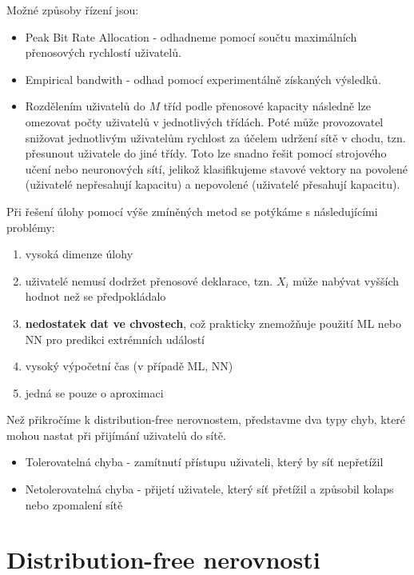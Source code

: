 \documentclass{article}
\theoremstyle{remark}
\theoremstyle{plain}
\theoremstyle{definition}
\theoremstyle{remark}
\begin{document}
Možné způsoby řízení jsou:

\begin{itemize}
    \item Peak Bit Rate Allocation - odhadneme pomocí součtu maximálních přenosových rychlostí uživatelů.
    \item Empirical bandwith - odhad pomocí experimentálně získaných výsledků.
    \item Rozdělením uživatelů do $M$ tříd podle přenosové kapacity následně lze omezovat počty uživatelů v jednotlivých třídách. Poté může provozovatel snižovat jednotlivým uživatelům rychlost za účelem udržení sítě v chodu, tzn. přesunout uživatele do jiné třídy. Toto lze snadno řešit pomocí strojového učení nebo neuronových sítí, jelikož klasifikujeme stavové vektory na povolené (uživatelé nepřesahují kapacitu) a nepovolené (uživatelé přesahují kapacitu).
\end{itemize}

Při řešení úlohy pomocí výše zmíněných metod se potýkáme s následujícími problémy:

\begin{enumerate}
    \item vysoká dimenze úlohy
    \item uživatelé nemusí dodržet přenosové deklarace, tzn. $X_i$ může nabývat vyšších hodnot než se předpokládalo
    \item \textbf{nedostatek dat ve chvostech}, což prakticky znemožňuje použití ML nebo NN pro predikci extrémních událostí
    \item vysoký výpočetní čas (v případě ML, NN)
    \item jedná se pouze o aproximaci
\end{enumerate}

Než přikročíme k distribution-free nerovnostem, představme dva typy chyb, které mohou nastat při přijímání uživatelů do sítě.

\begin{itemize}
    \item Tolerovatelná chyba - zamítnutí přístupu uživateli, který by síť nepřetížil
    \item Netolerovatelná chyba - přijetí uživatele, který síť přetížil a způsobil kolaps nebo zpomalení sítě
\end{itemize}

\newpage
\section{Distribution-free nerovnosti}
\end{document}
